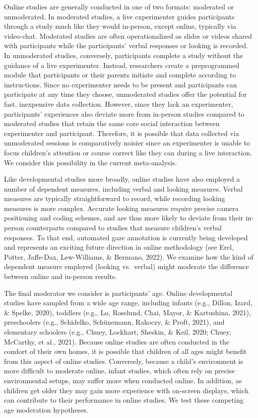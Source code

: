 \documentclass[
  man,floatsintext]{apa6}
\begin{document}
Online studies are generally conducted in one of two formats: moderated or unmoderated. In moderated studies, a live experimenter guides participants through a study much like they would in-person, except online, typically via video-chat. Moderated studies are often operationalized as slides or videos shared with participants while the participants' verbal responses or looking is recorded. In unmoderated studies, conversely, participants complete a study without the guidance of a live experimenter. Instead, researchers create a preprogrammed module that participants or their parents initiate and complete according to instructions. Since no experimenter needs to be present and participants can participate at any time they choose, unmoderated studies offer the potential for fast, inexpensive data collection. However, since they lack an experimenter, participants' experiences also deviate more from in-person studies compared to moderated studies that retain the same core social interaction between experimenter and participant. Therefore, it is possible that data collected via unmoderated sessions is comparatively noisier since an experimenter is unable to focus children's attention or course correct like they can during a live interaction. We consider this possibility in the current meta-analysis.

Like developmental studies more broadly, online studies have also employed a number of dependent measures, including verbal and looking measures. Verbal measures are typically straightforward to record, while recording looking measures is more complex. Accurate looking measures require precise camera positioning and coding schemes, and are thus more likely to deviate from their in-person counterparts compared to studies that measure children's verbal responses. To that end, automated gaze annotation is currently being developed and represents an exciting future direction in online methodology (see Erel, Potter, Jaffe-Dax, Lew-Williams, \& Bermano, 2022). We examine how the kind of dependent measure employed (looking vs.~verbal) might moderate the difference between online and in-person results.

The final moderator we consider is participants' age. Online developmental studies have sampled from a wide age range, including infants (e.g., Dillon, Izard, \& Spelke, 2020), toddlers (e.g., Lo, Rosslund, Chai, Mayor, \& Kartushina, 2021), preschoolers (e.g., Schidelko, Schünemann, Rakoczy, \& Proft, 2021), and elementary schoolers (e.g., Chuey, Lockhart, Sheskin, \& Keil, 2020; Chuey, McCarthy, et al., 2021). Because online studies are often conducted in the comfort of their own homes, it is possible that children of all ages might benefit from this aspect of online studies. Conversely, because a child's environment is more difficult to moderate online, infant studies, which often rely on precise environmental setups, may suffer more when conducted online. In addition, as children get older they may gain more experience with on-screen displays, which can contribute to their performance in online studies. We test these competing age moderation hypotheses.
\end{document}
